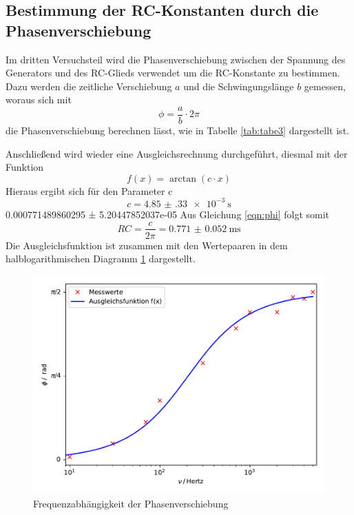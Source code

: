 \subsection{Bestimmung der RC-Konstanten durch die Phasenverschiebung}
Im dritten Versuchsteil wird die Phasenverschiebung zwischen der Spannung
des Generators und des RC-Glieds verwendet um die RC-Konstante zu bestimmen. Dazu
werden die zeitliche Verschiebung $a$ und die Schwingungslänge $b$ gemessen,
woraus sich mit
\begin{equation}
  \phi = \frac{a}{b} \cdot 2\pi
\end{equation}
die Phasenverschiebung berechnen lässt, wie in Tabelle \ref{tab:tabe3}
dargestellt ist.

\noindent Anschließend wird wieder eine Ausgleichsrechnung durchgeführt, diesmal mit der
Funktion
\begin{equation}
  f(x) = \arctan (c \cdot x)
\end{equation}
Hieraus ergibt sich für den Parameter c
\begin{equation*}
  c = \SI{4.85(33)e-3}{\second}
\end{equation*}      0.000771489860295 ± 5.20447852037e-05
Aus Gleichung \ref{eqn:phi} folgt somit
\begin{equation}
   RC = \frac{c}{2\pi}= \SI{0.771(52)}{\milli\second}
\end{equation}
Die Ausgleichsfunktion ist zusammen mit den Wertepaaren in dem halblogarithmischen
Diagramm \ref{fig:phase} dargestellt.
\begin{figure}[H]
  \centering
  \includegraphics{plot3.pdf}
  \caption{Frequenzabhängigkeit der Phasenverschiebung}
  \label{fig:phase}
\end{figure}

